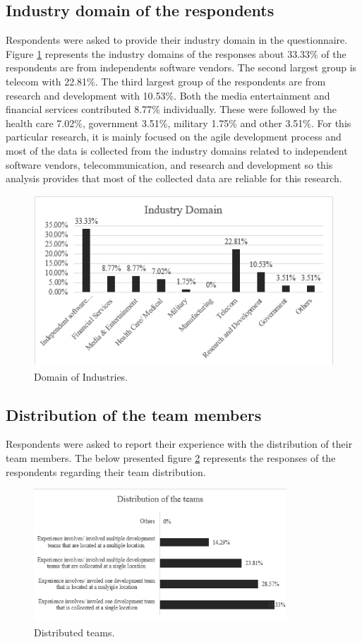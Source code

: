 \documentclass[a4paper,oneside]{bth}
\begin{document}
\subsection{Industry domain of the respondents}
Respondents were asked to provide their industry domain in the questionnaire. Figure \ref{domain} represents the industry domains of the responses about 33.33\% of the respondents are from independents software vendors. The second largest group is telecom with 22.81\%. The third largest group of the respondents are from research and development with 10.53\%. Both the media entertainment and financial services contributed 8.77\% individually. These were followed by the health care 7.02\%, government 3.51\%, military 1.75\% and other 3.51\%. For this particular research, it is mainly focused on the agile development process and most of the data is collected from the industry domains related to independent software vendors, telecommunication, and research and development so this analysis provides that most of the collected data are reliable for this research.
\begin{figure}[h]
\centering
\includegraphics{Domain of industries.png}
\caption{Domain of Industries. \label{domain}}
\end{figure}
\subsection{Distribution of the team members}
Respondents were asked to report their experience with the distribution of their team members. The below presented figure \ref{distribution} represents the responses of the respondents regarding their team distribution.
\begin{figure}[h]
\centering
\includegraphics[height=5cm]{distributed teams.png}
\caption{Distributed teams. \label{distribution}}
\end{figure}
\end{document}

